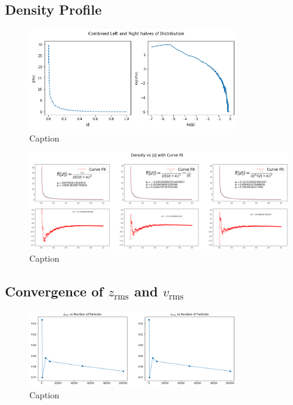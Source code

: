 \documentclass[oneside]{book}
\begin{document}
\subsection{Density Profile}
\begin{figure}[h]
    \centering
    \includegraphics[width = 0.8\textwidth]{Images/DensityProfile.png}
    \caption{Caption}
    \label{fig:my_label}
\end{figure}

\begin{figure}[h]
    \centering
    \includegraphics[width = \textwidth]{Images/DensityCurveFit.png}
    \caption{Caption}
    \label{fig:my_label}
\end{figure}

\subsection{Convergence of $z_\text{rms}$ and $v_\text{rms}$}
\begin{figure}[h]
    \centering
    \includegraphics[width=0.8\textwidth]{Images/RMS_Convergence.png}
    \caption{Caption}
    \label{fig:my_label}
\end{figure}
\end{document}
